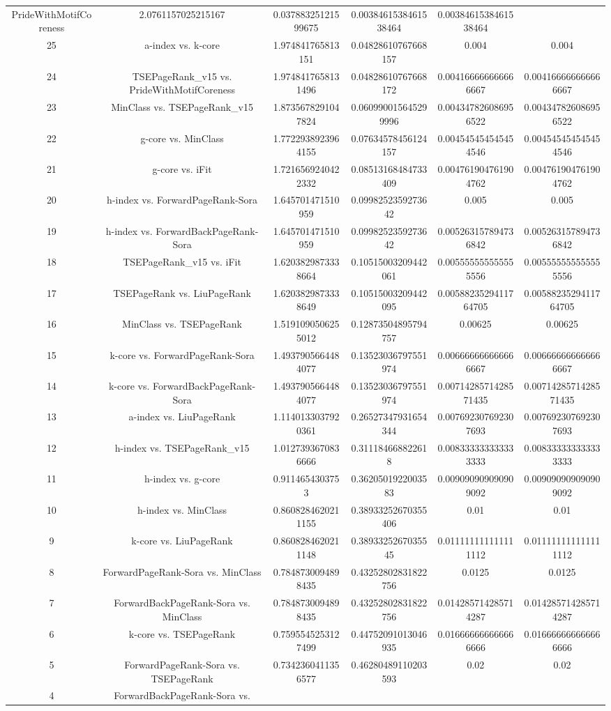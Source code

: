 \documentclass[a4paper,10pt]{article}
\begin{document}
\begin{landscape}
\begin{table}[!htp]
\begin{tabular}{cccccc}
PrideWithMotifCoreness&2.0761157025215167&0.03788325121599675&0.0038461538461538464&0.0038461538461538464\\25&a-index vs. k-core&1.974841765813151&0.04828610767668157&0.004&0.004\\24&TSEPageRank_v15 vs. PrideWithMotifCoreness&1.9748417658131496&0.04828610767668172&0.004166666666666667&0.004166666666666667\\23&MinClass vs. TSEPageRank_v15&1.8735678291047824&0.060990015645299996&0.004347826086956522&0.004347826086956522\\22&g-core vs. MinClass&1.7722938923964155&0.07634578456124157&0.004545454545454546&0.004545454545454546\\21&g-core vs. iFit&1.7216569240422332&0.08513168484733409&0.004761904761904762&0.004761904761904762\\20&h-index vs. ForwardPageRank-Sora&1.645701471510959&0.0998252359273642&0.005&0.005\\19&h-index vs. ForwardBackPageRank-Sora&1.645701471510959&0.0998252359273642&0.005263157894736842&0.005263157894736842\\18&TSEPageRank_v15 vs. iFit&1.6203829873338664&0.10515003209442061&0.005555555555555556&0.005555555555555556\\17&TSEPageRank vs. LiuPageRank&1.6203829873338649&0.10515003209442095&0.0058823529411764705&0.0058823529411764705\\16&MinClass vs. TSEPageRank&1.5191090506255012&0.12873504895794757&0.00625&0.00625\\15&k-core vs. ForwardPageRank-Sora&1.4937905664484077&0.13523036797551974&0.006666666666666667&0.006666666666666667\\14&k-core vs. ForwardBackPageRank-Sora&1.4937905664484077&0.13523036797551974&0.0071428571428571435&0.0071428571428571435\\13&a-index vs. LiuPageRank&1.1140133037920361&0.26527347931654344&0.007692307692307693&0.007692307692307693\\12&h-index vs. TSEPageRank_v15&1.0127393670836666&0.311184668822618&0.008333333333333333&0.008333333333333333\\11&h-index vs. g-core&0.9114654303753&0.3620501922003583&0.009090909090909092&0.009090909090909092\\10&h-index vs. MinClass&0.8608284620211155&0.38933252670355406&0.01&0.01\\9&k-core vs. LiuPageRank&0.8608284620211148&0.3893325267035545&0.011111111111111112&0.011111111111111112\\8&ForwardPageRank-Sora vs. MinClass&0.7848730094898435&0.43252802831822756&0.0125&0.0125\\7&ForwardBackPageRank-Sora vs. MinClass&0.7848730094898435&0.43252802831822756&0.014285714285714287&0.014285714285714287\\6&k-core vs. TSEPageRank&0.7595545253127499&0.44752091013046935&0.016666666666666666&0.016666666666666666\\5&ForwardPageRank-Sora vs. TSEPageRank&0.7342360411356577&0.46280489110203593&0.02&0.02\\4&ForwardBackPageRank-Sora vs. 
\end{tabular}
\end{table}
\end{landscape}
\end{document}
